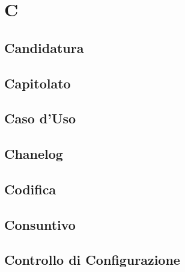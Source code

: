 \section{C} 
\subsection{Candidatura} 

\subsection{Capitolato} 

\subsection{Caso d'Uso} 

\subsection{Chanelog} 

\subsection{Codifica} 

\subsection{Consuntivo} 

\subsection{Controllo di Configurazione} 

